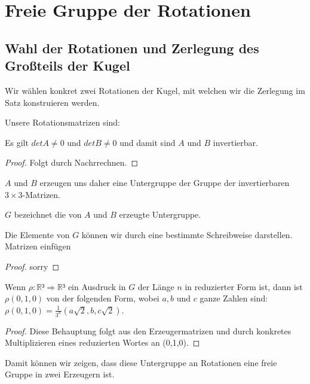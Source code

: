 \chapter{Freie Gruppe der Rotationen}


\section{Wahl der Rotationen und Zerlegung des Großteils der Kugel}




Wir wählen konkret zwei Rotationen der Kugel, mit welchen wir die Zerlegung im Satz konstruieren werden.
\begin{definition}\label{def:konk_rot}
\leanok {}
Unsere Rotationsmatrizen sind: 

\end{definition}

\begin{lemma} \label{lemma:a_b_invertierbar}
Es gilt $det A\neq 0$ und $det B\neq 0$ und damit sind $A$ und $B$ invertierbar.
\leanok
\end{lemma}
\begin{proof}  \leanok 
Folgt durch Nachrrechnen.
\end{proof}

$A$ und $B$ erzeugen uns daher eine Untergruppe der Gruppe der invertierbaren $3\times3$-Matrizen.
\begin{definition}\label{def:konk_rot_erzeugt} 
$G$ bezeichnet die von $A$ und $B$ erzeugte Untergruppe.
\leanok {}
\end{definition}

\begin{lemma}\label{lem:darst_von_rot_matrix}
Die Elemente von $G$ können wir durch eine bestimmte Schreibweise darstellen.
 \leanok
Matrizen einfügen
\end{lemma}
\begin{proof}
sorry
\end{proof}

\begin{lemma}\label{lem:darst_von_rot_res}
\leanok
Wenn $\rho : \mathbb{R}³\Rightarrow\mathbb{R}³$ ein Ausdruck in $G$ der Länge 
$n$ in reduzierter Form ist, dann ist $\rho(0,1,0)$ von der folgenden Form, wobei
$a, b$ und $c$ ganze Zahlen sind: $\rho(0,1,0)=\frac{1}{3^n}(a\sqrt{2},b,c\sqrt{2})$.
\end{lemma}
\begin{proof} 
\leanok Diese Behauptung folgt aus den Erzeugermatrizen
und durch konkretes Multiplizieren eines reduzierten Wortes an (0,1,0).
\end{proof}
Damit können wir zeigen, dass diese Untergruppe an Rotationen eine freie Gruppe in zwei Erzeugern ist.


